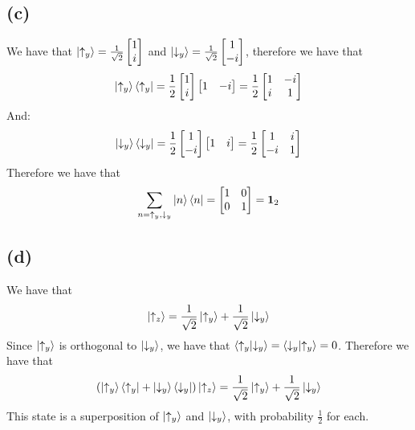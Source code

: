 \documentclass[11pt]{article}
\begin{document}
\subsection*{(c)}
We have that $\ket{\uparrow_y}=\frac{1}{\sqrt{2}}
\begin{bmatrix}
    1 \\
    i
\end{bmatrix}$
and $\ket{\downarrow_y}=\frac{1}{\sqrt{2}}
\begin{bmatrix}
    1 \\
    -i
\end{bmatrix}$, therefore we have that
$$\ket{\uparrow_y}\bra{\uparrow_y}=\frac{1}{2}
\begin{bmatrix}
    1\\
    i
\end{bmatrix}
\begin{bmatrix}
    1 & -i
\end{bmatrix}=
\frac{1}{2}\begin{bmatrix}
    1 & -i \\
    i & 1
\end{bmatrix}$$
And:
$$\ket{\downarrow_y}\bra{\downarrow_y}=\frac{1}{2}
\begin{bmatrix}
    1\\
    -i
\end{bmatrix}
\begin{bmatrix}
    1 & i
\end{bmatrix}=
\frac{1}{2}\begin{bmatrix}
    1 & i \\
    -i & 1
\end{bmatrix}$$
Therefore we have that
$$\sum_{n=\uparrow_y,\downarrow_y} \ket{n}\bra{n}=
\begin{bmatrix}
    1 & 0 \\
    0 & 1
\end{bmatrix}=\mathbf{1}_2$$
\subsection*{(d)}
We have that 
$$\ket{\uparrow_z}=\frac{1}{\sqrt{2}}\ket{\uparrow_y}
+\frac{1}{\sqrt{2}}\ket{\downarrow_y}$$
Since $\ket{\uparrow_y}$ is 
orthogonal to $\ket{\downarrow_y}$, we have that 
$\bra{\uparrow_y}\ket{\downarrow_y}=\bra{\downarrow_y}\ket{\uparrow_y}=0$.
Therefore we have that
$$\left(
    \ket{\uparrow_y}\bra{\uparrow_y}
    +\ket{\downarrow_y}\bra{\downarrow_y}
\right)
\ket{\uparrow_z}=
\frac{1}{\sqrt{2}}\ket{\uparrow_y}+
\frac{1}{\sqrt{2}}\ket{\downarrow_y}$$
This state is a superposition of 
$\ket{\uparrow_y}$ and $\ket{\downarrow_y}$, with probability 
$\frac{1}{2}$ for each. 
\end{document}
